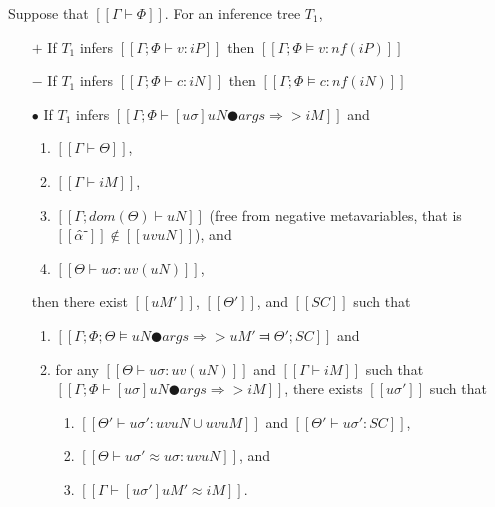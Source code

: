 \begin{lemma}
    \label{lemma:typing-completeness}
    Suppose that $[[Γ ⊢ Φ]]$.
    For an inference tree $T_1$,
    \begin{itemize}
        \item [$+$] If $T_1$ infers $[[Γ; Φ ⊢ v : iP]]$ then $[[Γ; Φ ⊨ v : nf(iP)]]$        
        \item [$-$] If $T_1$ infers $[[Γ; Φ ⊢ c : iN]]$ then  $[[Γ; Φ ⊨ c : nf(iN)]]$
        \item [$\bullet$] If 
            $T_1$ infers $[[Γ; Φ ⊢ [uσ]uN ● args ⇒> iM]]$
            and 
            \begin{enumerate}
                \item $[[Γ ⊢ Θ]]$, 
                \item $[[Γ ⊢ iM]]$,
                \item $[[Γ; dom(Θ) ⊢ uN]]$ (free from negative metavariables, that is $[[α̂⁻]] \notin [[uv uN]]$), and
                \item $[[Θ ⊢ uσ : uv(uN)]]$,
            \end{enumerate}
            then there exist $[[uM']]$, $[[Θ']]$, and $[[SC]]$ such that
            \begin{enumerate}
                \item $[[ Γ; Φ; Θ ⊨ uN ● args ⇒> uM' ⫤ Θ'; SC ]]$ and
                \item for any $[[Θ ⊢ uσ : uv(uN)]]$ and $[[Γ ⊢ iM]]$
                    such that $[[Γ; Φ ⊢ [uσ]uN ● args ⇒> iM]]$, 
                    there exists $[[uσ']]$ such that 
                    \begin{enumerate}
                        \item $[[Θ' ⊢ uσ' : uv uN ∪ uv uM]]$
                            and $[[Θ' ⊢ uσ' : SC]]$,
                        \item $[[Θ ⊢ uσ' ≈ uσ : uv uN]]$, and 
                        \item $[[Γ ⊢ [uσ']uM' ≈ iM]]$.
                    \end{enumerate}
            \end{enumerate}
    \end{itemize}
\end{lemma}

